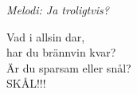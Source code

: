 {\footnotesize\textit{Melodi: Ja troligtvis?}}\par
\vspace{10pt}
Vad i allsin dar,\\
har du brännvin kvar?\\
Är du sparsam eller snål?\\
SKÅL!!!
